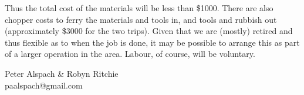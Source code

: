 \documentclass[12pt]{article} %
\begin{document}
Thus the total cost of the materials will be less than \$1000.  There are also chopper costs to ferry the materials and tools in, and tools and rubbish out (approximately \$3000 for the two trips).  Given that we are (mostly) retired and thus flexible as to when the job is done, it may be possible to arrange this as part of a larger operation in the area.  Labour, of course, will be voluntary.

\begin{flushright}
Peter Alspach \& Robyn Ritchie\\
paalspach@gmail.com
\end{flushright}
\end{document}
